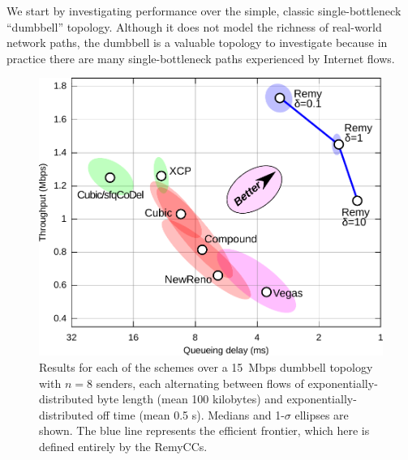 We start by investigating performance over the simple, classic
single-bottleneck ``dumbbell'' topology.  Although it does not model
the richness of real-world network paths, the dumbbell is a valuable
topology to investigate because in practice there are many
single-bottleneck paths experienced by Internet flows.

\begin{figure}
\includegraphics[width=\columnwidth]{eth8-final-bytes.pdf}
\caption{Results for each of the schemes over a 15~Mbps dumbbell
  topology with $n = 8$ senders, each alternating between flows of
  exponentially-distributed byte length (mean 100 kilobytes) and
  exponentially-distributed off time (mean 0.5 s). Medians and
  1-$\sigma$ ellipses are shown. The blue line represents the
  efficient frontier, which here is defined entirely by
  the RemyCCs.}

\label{f:tpdelaydb4}

\end{figure}

